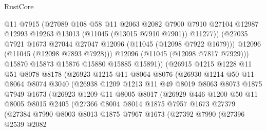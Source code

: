 \begin{lexlean}{RustCore}
\begin{coremodule}
                      @11
                      @7915
                      (@27089
                        @108
                        @58
                        @11
                        @2063
                        @2082
                        @7900
                        @7910
                        @27104
                        @12987
                        @12993
                        @19263
                        @13013
                        (@11045 (@13015 @7910 @7901))
                        @11277))
                    (@27035 @7921 @1673 @27044 @27047 @12096 (@11045 (@12098 @7922 @1679)))
                    @12096
                    (@11045 (@12098 @7893 @7928)))
                  @12096
                  (@11045 (@12098 @7817 @7929)))
                @15870
                @15873
                @15876
                @15880
                @15885
                @15891))
            (@26915
              @1215
              @1228
              @11
              @51
              @8078
              @8178
              (@26923
                @1215
                @11
                @8064
                @8076
                (@26930
                  @1214
                  @50
                  @11
                  @8064
                  @8074
                  @3040
                  (@26938
                    @1209
                    @1213
                    @11
                    @49
                    @8019
                    @8063
                    @8073
                    @1875
                    @7949
                    @1673
                    (@26923
                      @1209
                      @11
                      @8005
                      @8017
                      (@26929
                        @446
                        @1200
                        @50
                        @11
                        @8005
                        @8015
                        @2405
                        (@27366
                          @8004
                          @8014
                          @1875
                          @7957
                          @1673
                          @27379
                          (@27384
                            @7990
                            @8003
                            @8013
                            @1875
                            @7967
                            @1673
                            (@27392
                              @7990
                              (@27396
                                @2539
                                @2082

\end{coremodule}
\end{lexlean}
